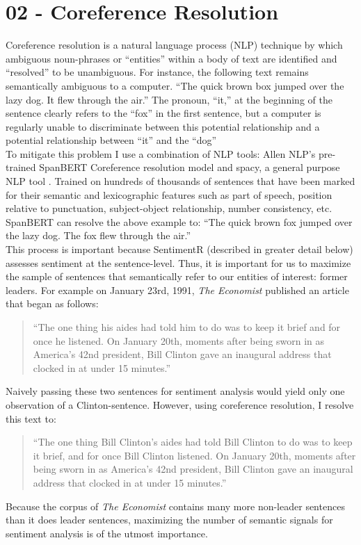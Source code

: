 \documentclass[11pt, letterpaper, twoside]{article}
\begin{document}
\section{02 - Coreference Resolution}
Coreference resolution is a natural language process (NLP) technique by which ambiguous noun-phrases or ``entities'' within a body of text are identified and ``resolved'' to be unambiguous. For instance, the following text remains semantically ambiguous to a computer. ``The quick brown box jumped over the lazy dog. It flew through the air.'' The pronoun, ``it,'' at the beginning of the sentence clearly refers to the ``fox'' in the first sentence, but a computer is regularly unable to discriminate between this potential relationship and a potential relationship between ``it'' and the ``dog''\\

To mitigate this problem I use a combination of NLP tools: Allen NLP's pre-trained SpanBERT Coreference resolution model and spacy, a general purpose NLP tool \cite{Lee2018HigherorderCR}. Trained on hundreds of thousands of sentences that have been marked for their semantic and lexicographic features such as part of speech, position relative to punctuation, subject-object relationship, number consistency, etc. SpanBERT  can resolve the above example to: ``The quick brown fox jumped over the lazy dog. The fox flew through the air.''\\

This process is important because SentimentR (described in greater detail below) assesses sentiment at the sentence-level. Thus, it is important for us to maximize the sample of sentences that semantically refer to our entities of interest: former leaders. For example on January 23rd, 1991, \textit{The Economist} published an article that began as follows:
\begin{quote}
    ``The one thing his aides had told him to do was to keep it brief and for once he listened. On January 20th, moments after being sworn in as America's 42nd president, Bill Clinton gave an inaugural address that clocked in at under 15 minutes.''
\end{quote}
Naively passing these two sentences for sentiment analysis would yield only one observation of a Clinton-sentence. However, using coreference resolution, I resolve this text to:
\begin{quote}
    ``The one thing Bill Clinton's aides had told Bill Clinton to do was to keep it brief, and for once Bill Clinton listened. On January 20th, moments after being sworn in as America's 42nd president, Bill Clinton gave an inaugural address that clocked in at under 15 minutes.''
\end{quote}
Because the corpus of \textit{The Economist} contains many more non-leader sentences than it does leader sentences, maximizing the number of semantic signals for sentiment analysis is of the utmost importance.
\end{document}
